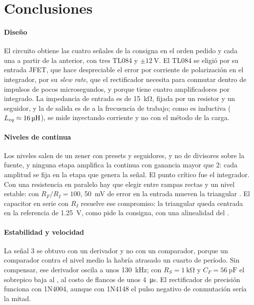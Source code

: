 \section{Conclusiones}
\label{sec:conclusiones}

\paragraph*{Diseño} El circuito obtiene las cuatro señales de la consigna en el orden pedido y cada una a partir de la anterior, con tres TL084 y $\pm\SI{12}{\volt}$. El TL084 se eligió por su entrada JFET, que hace despreciable el error por corriente de polarización en el integrador, por su \emph{slew rate}, que el rectificador necesita para conmutar dentro de impulsos de pocos microsegundos, y porque tiene cuatro amplificadores por integrado. La impedancia de entrada es de \SI{15}{\kilo\ohm}, fijada por un resistor y un seguidor, y la de salida es de  a la frecuencia de trabajo; como es inductiva ($L_{eq} \approx \valu{0}{\teoLeq}{\micro\henry}$), se mide inyectando corriente y no con el método de la carga.

\paragraph*{Niveles de continua} Los niveles salen de un zener con presets y seguidores, y no de divisores sobre la fuente, y ninguna etapa amplifica la continua con ganancia mayor que 2: cada amplitud se fija en la etapa que genera la señal. El punto crítico fue el integrador. Con una resistencia en paralelo hay que elegir entre rampas rectas y un nivel estable: con $R_F/R_I = 100$, \SI{50}{\milli\volt} de error en la entrada mueven la triangular . El capacitor en serie con $R_I$ resuelve ese compromiso: la triangular queda centrada en la referencia de \SI{1,25}{\volt}, como pide la consigna, con una alinealidad del .

\paragraph*{Estabilidad y velocidad} La señal 3 se obtuvo con un derivador y no con un comparador, porque un comparador contra el nivel medio la habría atrasado un cuarto de período. Sin compensar, ese derivador oscila a unos \SI{130}{\kilo\hertz}; con $R_S = \SI{1}{\kilo\ohm}$ y $C_F = \SI{56}{\pico\farad}$ el sobrepico baja al , al costo de flancos de unos \SI{4}{\micro\second}. El rectificador de precisión funciona con 1N4004, aunque con 1N4148 el pulso negativo de conmutación sería la mitad.

